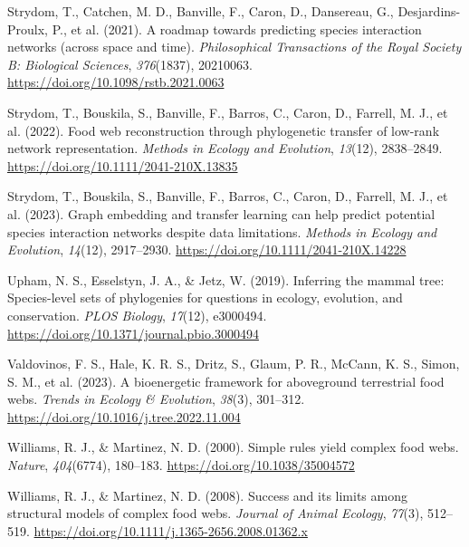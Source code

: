 \documentclass[
]{agujournal2019}
\newlength{\cslhangindent}
\newenvironment{CSLReferences}[2] %
 {\begin{list}{}{%
  \setlength{\itemindent}{0pt}
  \setlength{\leftmargin}{0pt}
  \setlength{\parsep}{0pt}
  \ifodd #1
   \setlength{\leftmargin}{\cslhangindent}
   \setlength{\itemindent}{-1\cslhangindent}
  \fi
  \setlength{\itemsep}{#2\baselineskip}}}
 {\end{list}}
\begin{document}
\begin{CSLReferences}{1}{0}
Strydom, T., Catchen, M. D., Banville, F., Caron, D., Dansereau, G.,
Desjardins-Proulx, P., et al. (2021). A roadmap towards predicting
species interaction networks (across space and time).
\emph{Philosophical Transactions of the Royal Society B: Biological
Sciences}, \emph{376}(1837), 20210063.
\url{https://doi.org/10.1098/rstb.2021.0063}

Strydom, T., Bouskila, S., Banville, F., Barros, C., Caron, D., Farrell,
M. J., et al. (2022). Food web reconstruction through phylogenetic
transfer of low-rank network representation. \emph{Methods in Ecology
and Evolution}, \emph{13}(12), 2838--2849.
\url{https://doi.org/10.1111/2041-210X.13835}

Strydom, T., Bouskila, S., Banville, F., Barros, C., Caron, D., Farrell,
M. J., et al. (2023). Graph embedding and transfer learning can help
predict potential species interaction networks despite data limitations.
\emph{Methods in Ecology and Evolution}, \emph{14}(12), 2917--2930.
\url{https://doi.org/10.1111/2041-210X.14228}

Upham, N. S., Esselstyn, J. A., \& Jetz, W. (2019). Inferring the mammal
tree: {Species-level} sets of phylogenies for questions in ecology,
evolution, and conservation. \emph{PLOS Biology}, \emph{17}(12),
e3000494. \url{https://doi.org/10.1371/journal.pbio.3000494}

Valdovinos, F. S., Hale, K. R. S., Dritz, S., Glaum, P. R., McCann, K.
S., Simon, S. M., et al. (2023). A bioenergetic framework for
aboveground terrestrial food webs. \emph{Trends in Ecology \&
Evolution}, \emph{38}(3), 301--312.
\url{https://doi.org/10.1016/j.tree.2022.11.004}

Williams, R. J., \& Martinez, N. D. (2000). Simple rules yield complex
food webs. \emph{Nature}, \emph{404}(6774), 180--183.
\url{https://doi.org/10.1038/35004572}

Williams, R. J., \& Martinez, N. D. (2008). Success and its limits among
structural models of complex food webs. \emph{Journal of Animal
Ecology}, \emph{77}(3), 512--519.
\url{https://doi.org/10.1111/j.1365-2656.2008.01362.x}


\end{CSLReferences}
\end{document}
